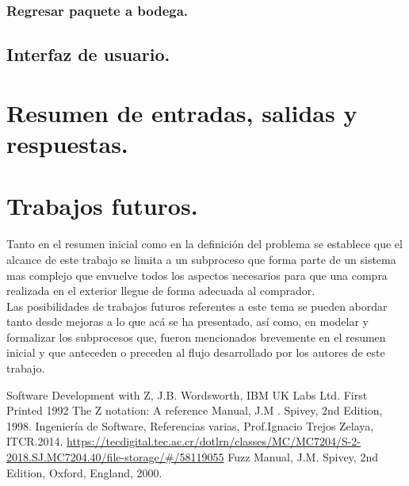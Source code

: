 \documentclass[12pt,a4paper,zed]{article}
\begin{document}
\subsubsection{Regresar paquete a bodega.}

\subsection{Interfaz de usuario.}

\section{Resumen de entradas, salidas y respuestas.}

\section{Trabajos futuros.}
Tanto en el resumen inicial como en la definición del problema se establece que el alcance de este trabajo se limita a un subproceso que forma parte de un sistema mas complejo que envuelve todos los aspectos necesarios para que una compra realizada en el exterior llegue de forma adecuada al comprador.\\[\baselineskip]
\indent Las posibilidades de trabajos futuros referentes a este tema se pueden abordar tanto desde mejoras a lo que acá se ha presentado, así como, en modelar y formalizar los subprocesos que, fueron mencionados brevemente en el resumen inicial y que anteceden o preceden al flujo desarrollado por los autores de este trabajo.


\newpage
\begin{thebibliography}{00}
 Software Development with Z, J.B. Wordsworth, IBM UK Labs Ltd. First Printed 1992
 The Z notation: A reference Manual, J.M . Spivey, 2nd Edition, 1998.
 Ingeniería de Software, Referencias varias, Prof.Ignacio Trejos Zelaya, ITCR.2014. \url{https://tecdigital.tec.ac.cr/dotlrn/classes/MC/MC7204/S-2-2018.SJ.MC7204.40/file-storage/#/58119055}
 Fuzz Manual, J.M. Spivey, 2nd Edition, Oxford, England, 2000.
\end{thebibliography}
\end{document}
